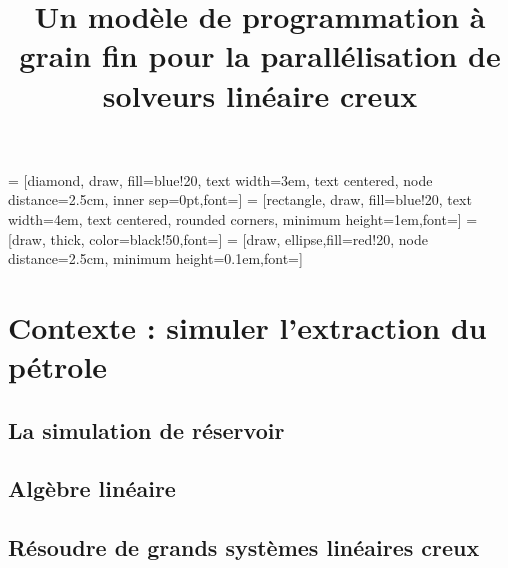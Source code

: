 \documentclass[oneside,12t]{classes/Thesis}
\title{Un modèle de programmation à grain fin pour la parallélisation de solveurs linéaire creux}
\begin{document}
\dominitoc
{} = [diamond, draw, fill=blue!20,
text width=3em, text centered, node distance=2.5cm, inner sep=0pt,font=\scriptsize]
 = [rectangle, draw, fill=blue!20,
text width=4em, text centered, rounded corners, minimum height=1em,font=\scriptsize]
 = [draw, thick, color=black!50,font=\scriptsize]
 = [draw, ellipse,fill=red!20, node distance=2.5cm,
minimum height=0.1em,font=\scriptsize]

\maketitle

\setcounter{secnumdepth}{3}
\setcounter{tocdepth}{3}

\frontmatter %
%
%
%
\tableofcontents
\mtcaddchapter
\mainmatter %



\chapter{Contexte : simuler l'extraction du pétrole}
\minitoc
\vspace{1cm}

\section{La simulation de réservoir}





\section{Algèbre linéaire}




\section{Résoudre de grands systèmes linéaires creux}



\end{document}
